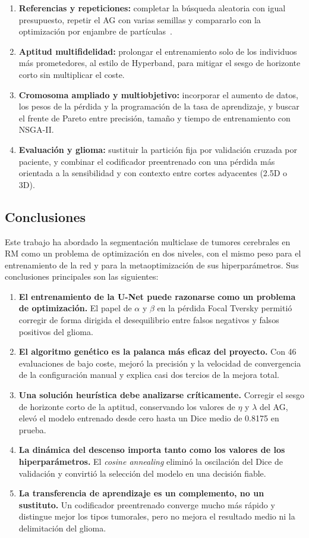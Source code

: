 \begin{enumerate}
  \item \textbf{Referencias y repeticiones:} completar la búsqueda aleatoria con igual presupuesto, repetir el AG con varias semillas y compararlo con la optimización por enjambre de partículas~\cite{kennedy1995pso}.
  \item \textbf{Aptitud multifidelidad:} prolongar el entrenamiento solo de los individuos más prometedores, al estilo de Hyperband, para mitigar el sesgo de horizonte corto sin multiplicar el coste.
  \item \textbf{Cromosoma ampliado y multiobjetivo:} incorporar el aumento de datos, los pesos de la pérdida y la programación de la tasa de aprendizaje, y buscar el frente de Pareto entre precisión, tamaño y tiempo de entrenamiento con NSGA-II.
  \item \textbf{Evaluación y glioma:} sustituir la partición fija por validación cruzada por paciente, y combinar el codificador preentrenado con una pérdida más orientada a la sensibilidad y con contexto entre cortes adyacentes (2.5D o 3D).
\end{enumerate}

\subsection{Conclusiones}\label{subsec:conclusiones}

Este trabajo ha abordado la segmentación multiclase de tumores cerebrales en RM como un problema de optimización en dos niveles, con el mismo peso para el entrenamiento de la red y para la metaoptimización de sus hiperparámetros. Sus conclusiones principales son las siguientes:

\begin{enumerate}
  \item \textbf{El entrenamiento de la U-Net puede razonarse como un problema de optimización.} El papel de $\alpha$ y $\beta$ en la pérdida Focal Tversky permitió corregir de forma dirigida el desequilibrio entre falsos negativos y falsos positivos del glioma.
  \item \textbf{El algoritmo genético es la palanca más eficaz del proyecto.} Con 46 evaluaciones de bajo coste, mejoró la precisión y la velocidad de convergencia de la configuración manual y explica casi dos tercios de la mejora total.
  \item \textbf{Una solución heurística debe analizarse críticamente.} Corregir el sesgo de horizonte corto de la aptitud, conservando los valores de $\eta$ y $\lambda$ del AG, elevó el modelo entrenado desde cero hasta un Dice medio de 0.8175 en prueba.
  \item \textbf{La dinámica del descenso importa tanto como los valores de los hiperparámetros.} El \textit{cosine annealing} eliminó la oscilación del Dice de validación y convirtió la selección del modelo en una decisión fiable.
  \item \textbf{La transferencia de aprendizaje es un complemento, no un sustituto.} Un codificador preentrenado converge mucho más rápido y distingue mejor los tipos tumorales, pero no mejora el resultado medio ni la delimitación del glioma.
\end{enumerate}

